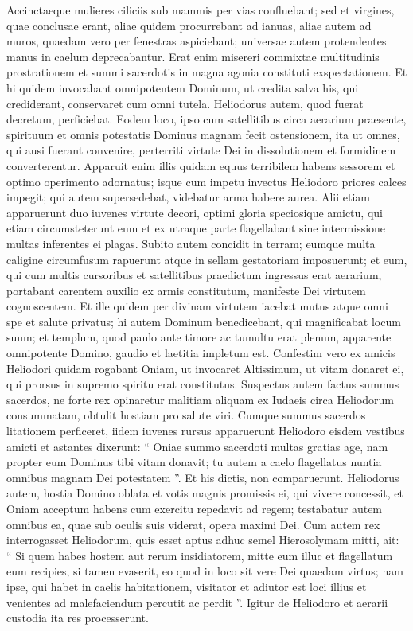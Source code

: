 \begin{biblechapter}
\begin{biblechapter}
\begin{biblechapter}
\verse Accinctaeque mulieres ciliciis sub mammis per vias confluebant; sed et virgines, quae conclusae erant, aliae quidem procurrebant ad ianuas, aliae autem ad muros, quaedam vero per fenestras aspiciebant; 
\verse universae autem protendentes manus in caelum deprecabantur. 
\verse Erat enim misereri commixtae multitudinis prostrationem et summi sacerdotis in magna agonia constituti exspectationem. 
 \verse Et hi quidem invocabant omnipotentem Dominum, ut credita salva his, qui crediderant, conservaret cum omni tutela.
 \verse Heliodorus autem, quod fuerat decretum, perficiebat. 
\verse Eodem loco, ipso cum satellitibus circa aerarium praesente, spirituum et omnis potestatis Dominus magnam fecit ostensionem, ita ut omnes, qui ausi fuerant convenire, perterriti virtute Dei in dissolutionem et formidinem converterentur. 
\verse Apparuit enim illis quidam equus terribilem habens sessorem et optimo operimento adornatus; isque cum impetu invectus Heliodoro priores calces impegit; qui autem supersedebat, videbatur arma habere aurea. 
\verse Alii etiam apparuerunt duo iuvenes virtute decori, optimi gloria speciosique amictu, qui etiam circumsteterunt eum et ex utraque parte flagellabant sine intermissione multas inferentes ei plagas. 
\verse Subito autem concidit in terram; eumque multa caligine circumfusum rapuerunt atque in sellam gestatoriam imposuerunt; 
\verse et eum, qui cum multis cursoribus et satellitibus praedictum ingressus erat aerarium, portabant carentem auxilio ex armis constitutum, manifeste Dei virtutem cognoscentem. 
 \verse Et ille quidem per divinam virtutem iacebat mutus atque omni spe et salute privatus; 
\verse hi autem Dominum benedicebant, qui magnificabat locum suum; et templum, quod paulo ante timore ac tumultu erat plenum, apparente omnipotente Domino, gaudio et laetitia impletum est. 
\verse Confestim vero ex amicis Heliodori quidam rogabant Oniam, ut invocaret Altissimum, ut vitam donaret ei, qui prorsus in supremo spiritu erat constitutus. 
\verse Suspectus autem factus summus sacerdos, ne forte rex opinaretur malitiam aliquam ex Iudaeis circa Heliodorum consummatam, obtulit hostiam pro salute viri. 
\verse Cumque summus sacerdos litationem perficeret, iidem iuvenes rursus apparuerunt Heliodoro eisdem vestibus amicti et astantes dixerunt: “ Oniae summo sacerdoti multas gratias age, nam propter eum Dominus tibi vitam donavit; 
\verse tu autem a caelo flagellatus nuntia omnibus magnam Dei potestatem ”. Et his dictis, non comparuerunt.
 \verse Heliodorus autem, hostia Domino oblata et votis magnis promissis ei, qui vivere concessit, et Oniam acceptum habens cum exercitu repedavit ad regem; 
 \verse testabatur autem omnibus ea, quae sub oculis suis viderat, opera maximi Dei. 
 \verse Cum autem rex interrogasset Heliodorum, quis esset aptus adhuc semel Hierosolymam mitti, ait: 
\verse “ Si quem habes hostem aut rerum insidiatorem, mitte eum illuc et flagellatum eum recipies, si tamen evaserit, eo quod in loco sit vere Dei quaedam virtus; 
\verse nam ipse, qui habet in caelis habitationem, visitator et adiutor est loci illius et venientes ad malefaciendum percutit ac perdit ”. 
\verse Igitur de Heliodoro et aerarii custodia ita res processerunt.
 

\end{biblechapter}
\end{biblechapter}
\end{biblechapter}
